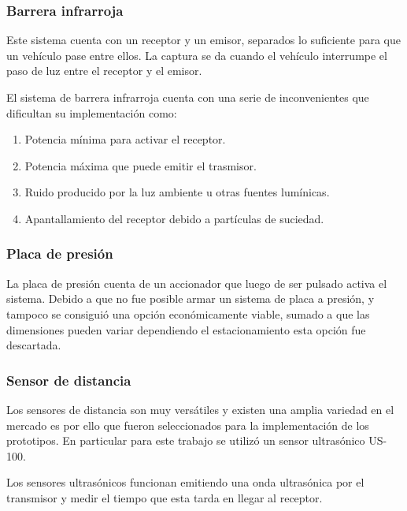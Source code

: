 \subsubsection{Barrera infrarroja}

Este sistema cuenta con un receptor y un emisor, separados lo suficiente para que un vehículo pase entre ellos. La captura se da cuando el vehículo interrumpe el paso de luz entre el receptor y el emisor.

El sistema de barrera infrarroja cuenta con una serie de inconvenientes que dificultan su implementación como:

\begin{enumerate}
    \item Potencia mínima para activar el receptor.
    \item Potencia máxima que puede emitir el trasmisor.
    \item Ruido producido por la luz ambiente u otras fuentes lumínicas.
    \item Apantallamiento del receptor debido a partículas de suciedad.
\end{enumerate}

\subsubsection{Placa de presión}

La placa de presión cuenta de un accionador que luego de ser pulsado activa el sistema. Debido a que no fue posible armar un sistema de placa a presión, y tampoco se consiguió una opción económicamente viable, sumado a que las dimensiones pueden variar dependiendo el estacionamiento esta opción fue descartada.

\subsubsection{Sensor de distancia}

Los sensores de distancia son muy versátiles y existen una amplia variedad en el mercado es por ello que fueron seleccionados para la implementación de los prototipos.
En particular para este trabajo se utilizó un sensor ultrasónico US-100.

Los sensores ultrasónicos funcionan emitiendo una onda ultrasónica por el transmisor y medir el tiempo que esta tarda en llegar al receptor.

